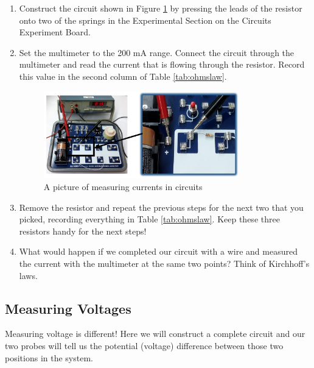 \begin{enumerate}
	\item Construct the circuit shown in Figure \ref{fig:currentpic} by pressing the leads of the resistor onto two of the springs in the Experimental Section on the Circuits Experiment Board.

	\item Set the multimeter to the 200 mA range. Connect the circuit through the multimeter and read the current that is flowing through the resistor. Record this value in the second column of Table \ref{tab:ohmslaw}.

	\begin{figure}[h]
	\centering
	\includegraphics[width=0.8\textwidth]{./Exp2/pic/currentpic.png}
	\caption{A picture of measuring currents in circuits}
	\label{fig:currentpic}
	\end{figure}

	\item Remove the resistor and repeat the previous steps for the next two that you picked, recording everything in Table \ref{tab:ohmslaw}. Keep these three resistors handy for the next steps!

	\item What would happen if we completed our circuit with a wire and measured the current with the multimeter at the same two points? Think of Kirchhoff's laws.

\end{enumerate}

\subsection{Measuring Voltages}
Measuring voltage is different! Here we will construct a complete circuit and our two probes will tell us the potential (voltage) difference between those two positions in the system.\myskip

